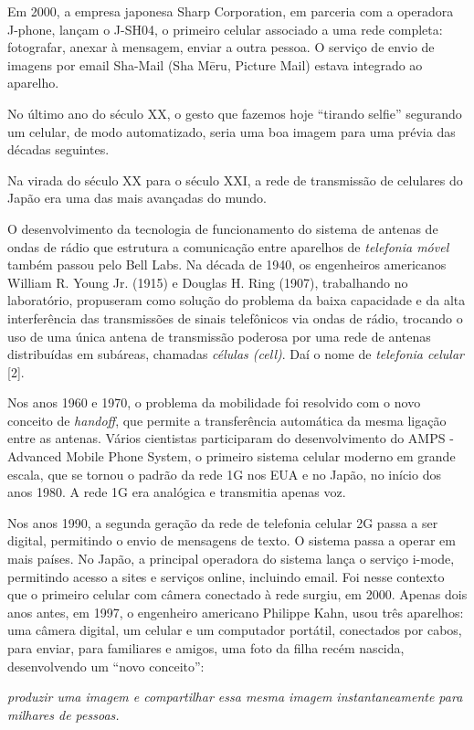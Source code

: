 \documentclass{hipatia}
\begin{document}
Em 2000, a empresa japonesa Sharp Corporation, em parceria com a operadora J-phone, lançam o J-SH04, o primeiro celular associado a uma rede completa: fotografar, anexar à mensagem, enviar a outra pessoa. O serviço de envio de imagens por email Sha-Mail (Sha Mēru, Picture Mail) estava integrado ao aparelho.

No último ano do século XX, o gesto que fazemos hoje ``tirando selfie'' segurando um celular, de modo automatizado, seria uma boa imagem para uma prévia das décadas seguintes.

Na virada do século XX para o século XXI, a rede de transmissão de celulares do Japão era uma das mais avançadas do mundo.

O desenvolvimento da tecnologia de funcionamento do sistema de antenas de ondas de rádio que estrutura a comunicação entre aparelhos de \textit{telefonia móvel} também passou pelo Bell Labs. Na década de 1940, os engenheiros americanos William R. Young Jr. (1915) e Douglas H. Ring (1907), trabalhando no laboratório, propuseram como solução do problema da baixa capacidade e da alta interferência das transmissões de sinais telefônicos via ondas de rádio, trocando o uso de uma única antena de transmissão poderosa por uma rede de antenas distribuídas em subáreas, chamadas \textit{células (cell)}. Daí o nome de \textit{telefonia celular} [2].

Nos anos 1960 e 1970, o problema da mobilidade foi resolvido com o novo conceito de \textit{handoff}, que permite a transferência automática da mesma ligação entre as antenas. Vários cientistas participaram do desenvolvimento do AMPS - Advanced Mobile Phone System, o primeiro sistema celular moderno em grande escala, que se tornou o padrão da rede 1G nos EUA e no Japão, no início dos anos 1980. A rede 1G era analógica e transmitia apenas voz.

 Nos anos 1990, a segunda geração da rede de telefonia celular 2G passa a ser digital, permitindo o envio de mensagens de texto. O sistema passa a operar em mais países. No Japão, a principal operadora do sistema lança o serviço i-mode, permitindo acesso a sites e serviços online, incluindo email. Foi nesse contexto que o primeiro celular com câmera conectado à rede surgiu, em 2000. Apenas dois anos antes, em 1997, o engenheiro americano Philippe Kahn, usou três aparelhos: uma câmera digital, um celular e um computador portátil, conectados por cabos, para enviar, para familiares e amigos, uma foto da filha recém nascida, desenvolvendo um ``novo conceito'':
\begin{center}
    \textit{produzir uma imagem e compartilhar essa mesma imagem instantaneamente para milhares de pessoas.}
\end{center}
\end{document}
